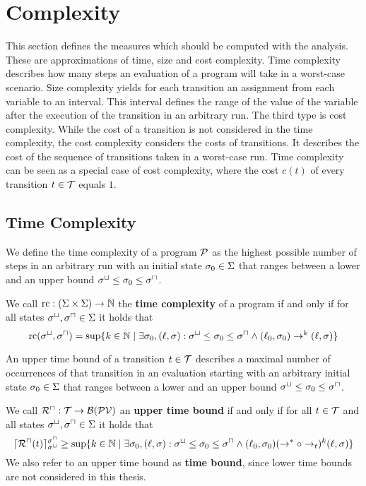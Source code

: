 \section{Complexity}

This section defines the measures which should be computed with the analysis.
These are approximations of time, size and cost complexity.
Time complexity describes how many steps an evaluation of a program will take in a worst-case scenario.
Size complexity yields for each transition an assignment from each variable to an interval.
This interval defines the range of the value of the variable after the execution of the transition in an arbitrary run.
The third type is cost complexity.
While the cost of a transition is not considered in the time complexity, the cost complexity considers the costs of transitions.
It describes the cost of the sequence of transitions taken in a worst-case run.
Time complexity can be seen as a special case of cost complexity, where the cost $c(t)$ of every transition $t \in \mathcal{T}$ equals $1$.

\subsection{Time Complexity}

We define the time complexity of a program $\mathcal{P}$ as the highest possible number of steps in an arbitrary run with an initial state $\sigma_0 \in \Sigma$ that ranges between a lower and an upper bound ${\sigma^\sqcup} \leq \sigma_0 \leq {\sigma^\sqcap}$.

\begin{definition}
  We call $\text{rc}: (\Sigma \times \Sigma) \rightarrow \mathbb{N}$ the \textbf{time complexity} of a program if and only if for all states ${\sigma^\sqcup}, {\sigma^\sqcap} \in \Sigma$ it holds that
  \[ \text{rc}({\sigma^\sqcup}, {\sigma^\sqcap}) = \sup \lbrace  k \in \mathbb{N} \mid \exists \sigma_0, (\ell, \sigma): {\sigma^\sqcup} \leq \sigma_0 \leq {\sigma^\sqcap} \wedge (\ell_0, \sigma_0) \rightarrow^k (\ell, \sigma)  \rbrace \]
\end{definition}

An upper time bound of a transition $t \in \mathcal{T}$ describes a maximal number of occurrences of that transition in an evaluation starting with an arbitrary initial state $\sigma_0 \in \Sigma$ that ranges between a lower and an upper bound ${\sigma^\sqcup} \leq \sigma_0 \leq {\sigma^\sqcap}$.

\begin{definition}
  We call ${\mathcal{R}^\sqcap}: \mathcal{T} \rightarrow \mathcal{B}(\mathcal{PV})$ an \textbf{upper time bound} if and only if for all $t \in \mathcal{T}$ and all states ${\sigma^\sqcup}, {\sigma^\sqcap} \in \Sigma$ it holds that
  \[ \lceil {\mathcal{R}^\sqcap}(t) \rceil^{{\sigma^\sqcap}}_{{\sigma^\sqcup}} \geq \sup \lbrace  k \in \mathbb{N} \mid \exists \sigma_0, (\ell, \sigma): {\sigma^\sqcup} \leq \sigma_0 \leq {\sigma^\sqcap} \wedge (\ell_0, \sigma_0) (\rightarrow^* \circ \rightarrow_t)^k (\ell, \sigma)  \rbrace \]
  We also refer to an upper time bound as \textbf{time bound}, since lower time bounds are not considered in this thesis.
\end{definition}

